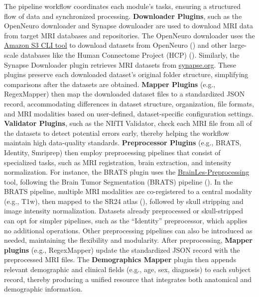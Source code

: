 The pipeline workflow coordinates each module's tasks, ensuring a structured flow of data and synchronized processing. 
\textbf{Downloader Plugins}, such as the OpenNeuro downloader and Synapse downloader are used to download MRI 
data from target MRI databases and repositories.
The OpenNeuro downloader uses the \href{https://docs.aws.amazon.com/cli/latest/reference/s3/}{Amazon S3 CLI tool} to download datasets 
from OpenNeuro (\cite{markiewicz2021openneuro}) and other large-scale databases like the Human Connectome Project (HCP) (\cite{van2013wu}).
Similarly, the Synapse Downloader plugin retrieves MRI datasets from \href{https://www.synapse.org}{synapse.org}.
These plugins preserve each downloaded dataset's original folder structure, simplifying comparisons after the datasets are obtained.
\textbf{Mapper Plugins} (e.g., RegexMapper) then map the downloaded dataset files to a standardized JSON record, 
accommodating differences in dataset structure, organization, file formats, and MRI modalities based on user-defined, 
dataset-specific configuration settings.
\textbf{Validator Plugins}, such as the NIfTI Validator, check each MRI file from all of the datasets 
to detect potential errors early, thereby helping the workflow maintain high data-quality standards.
\textbf{Preprocessor Plugins} (e.g., BRATS, Identity, Smriprep) then employ preprocessing pipelines
that consist of specialized tasks, such as MRI registration, brain extraction, and intensity normalization. 
For instance, the BRATS plugin uses the \href{https://github.com/BrainLesion/preprocessing}{BrainLes-Preprocessing} tool, 
following the Brain Tumor Segmentation (BRATS) pipeline (\cite{menze2014multimodal}). 
In the BRATS pipeline, multiple MRI modalities are co-registered to a central modality (e.g., T1w), 
then mapped to the SR24 atlas (\cite{rohlfing2010sri24}), followed by skull stripping and image intensity normalization. 
Datasets already preprocessed or skull-stripped can opt for simpler pipelines, 
such as the ``Identity'' preprocessor, which applies no additional operations. 
Other preprocessing pipelines can also be introduced as needed, maintaining the flexibility and modularity.
After preprocessing, \textbf{Mapper plugins} (e.g., RegexMapper) update the standardized JSON record 
with the preprocessed MRI files. The \textbf{Demographics Mapper} plugin then appends relevant demographic 
and clinical fields (e.g., age, sex, diagnosis) to each subject record, thereby producing a unified 
resource that integrates both anatomical and demographic information.

